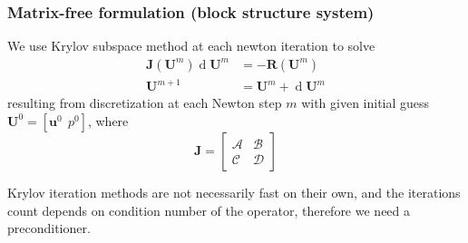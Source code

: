 \documentclass{beamer}
\newcommand{\bm}{\boldsymbol}
\newcommand\diff{\operatorname{d}\!}
\begin{document}
\begin{frame}
	\frametitle{Matrix-free formulation (block structure system)}
	We use Krylov subspace method at each newton iteration to solve
	\begin{equation}\label{eq:mixed-newton-iter}
		\begin{split}
			\bm J(\bm U^m) \diff \bm U^{m} &= - \bm R(\bm U^{m}) \\ \nonumber
			\bm U^{m+1} &= \bm{U}^{m} + \diff \bm U^{m}
		\end{split}
	\end{equation}
	resulting from discretization \alert{at each Newton step $m$} with given initial guess $\bm U^0 = [\bm u^0 ~ ~ p^0]$, where
	$$
	\bm J = \begin{bmatrix}
		\mathcal A & \mathcal B \\
		\mathcal C & \mathcal D
	\end{bmatrix}
	$$

	\begin{tcolorbox}
	Krylov iteration methods are not necessarily fast on their own, and the iterations count depends on condition number of the operator, therefore we need a preconditioner.
	\end{tcolorbox}
\end{frame}
\end{document}
